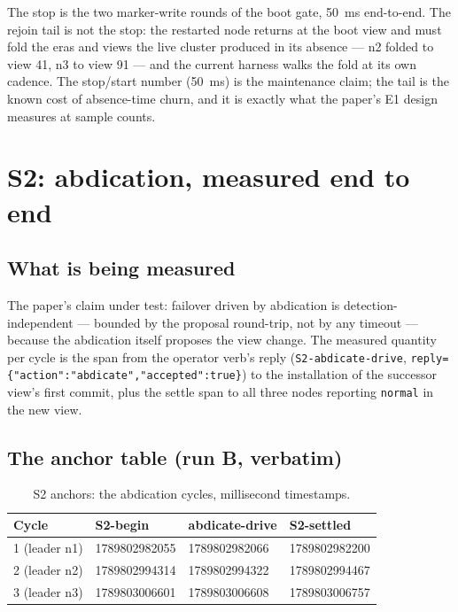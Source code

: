 \documentclass[10pt,journal,letterpaper]{IEEEtran}
\newcommand{\code}[1]{\texttt{\small #1}}
\begin{document}
The stop is the two marker-write rounds of the boot gate, 50~ms
end-to-end. The rejoin tail is not the stop: the restarted node
returns at the boot view and must fold the eras and views the live
cluster produced in its absence --- n2 folded to view 41, n3 to view
91 --- and the current harness walks the fold at its own cadence. The
stop/start number (50~ms) is the maintenance claim; the tail is the
known cost of absence-time churn, and it is exactly what the paper's
E1 design measures at sample counts.

\section{S2: abdication, measured end to end}
\label{sec:s2}

\subsection{What is being measured}

The paper's claim under test: failover driven by abdication is
detection-independent --- bounded by the proposal round-trip, not by
any timeout --- because the abdication itself proposes the view
change. The measured quantity per cycle is the span from the operator
verb's reply (\code{S2-abdicate-drive},
\code{reply=\{"action":"abdicate","accepted":true\}}) to the
installation of the successor view's first commit, plus the settle
span to all three nodes reporting \code{normal} in the new view.

\subsection{The anchor table (run B, verbatim)}

\begin{table}[h]
\centering
\caption{S2 anchors: the abdication cycles, millisecond timestamps.}
\label{tab:anchors}
\begin{tabular}{@{}llll@{}}
\toprule
Cycle & S2-begin & abdicate-drive & S2-settled\\
\midrule
1 (leader n1) & 1789802982055 & 1789802982066 & 1789802982200\\
2 (leader n2) & 1789802994314 & 1789802994322 & 1789802994467\\
3 (leader n3) & 1789803006601 & 1789803006608 & 1789803006757\\
\bottomrule
\end{tabular}
\end{table}
\end{document}
